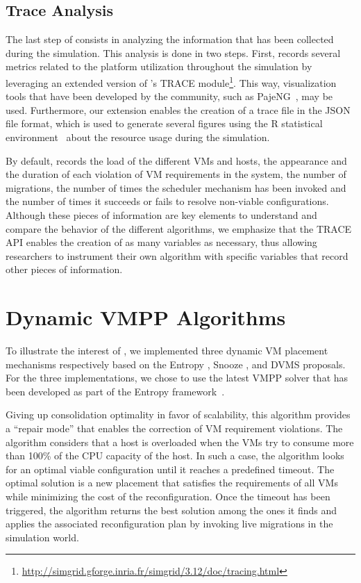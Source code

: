 \subsection{Trace Analysis}
\label{subsec:traces-analysis}

The last step of \vmps consists in analyzing the information that has
been collected during the simulation.
This analysis is done in two steps. First, \vmps records several
metrics related to the platform utilization throughout the simulation
by leveraging an extended version of \sg's TRACE
module\footnote{\url{http://simgrid.gforge.inria.fr/simgrid/3.12/doc/tracing.html}}.
This way, visualization tools that have been developed by the \sg
community, such as PajeNG~\cite{pageng:www}, may be used. Furthermore,
our extension enables the creation of a trace file in the JSON file
format, which is used to generate several figures using the R
statistical environment~\cite{R:Bloomfield:2014} about the resource
usage during the simulation.

By default, \vmps records the load of the different VMs and hosts, the
appearance and the duration of each violation of VM requirements in
the system, the number of migrations, the number of times the
scheduler mechanism has been invoked and the number of times it
succeeds or fails to resolve non-viable configurations.
%
Although these pieces of information are key elements to understand
and compare the behavior of the different algorithms, we emphasize
that the TRACE API enables the creation of as many variables as
necessary, thus allowing researchers to instrument their own algorithm
with specific variables that record other pieces of information.

\section{Dynamic VMPP Algorithms}
\label{sec:vm-schedulers}
To illustrate the interest of \vmps, we implemented three dynamic VM
placement mechanisms respectively based on the Entropy
\cite{Hermenier:2009:ECM:1508293.1508300}, Snooze
\cite{feller:ccgrid12}, and DVMS \cite{quesnel:cpe2012} proposals. For the three
implementations, we chose to use the latest VMPP solver that has been
developed as part of the Entropy
framework~\cite{hermenier:cp11}.

%
Giving up consolidation
optimality in favor of scalability, this algorithm provides a ``repair
mode'' that enables the correction of VM requirement violations. The algorithm considers that a host is
overloaded when the VMs try to consume more than 100\% of the CPU
capacity of the host. In such a case, the algorithm looks for
an optimal viable configuration until it reaches a predefined timeout.
The optimal solution is a new placement that satisfies
the requirements of all VMs while minimizing the cost of the
reconfiguration.
Once the timeout has been triggered, the algorithm returns
the best solution among the ones it finds and applies the associated
reconfiguration plan by invoking live migrations in the simulation
world.

